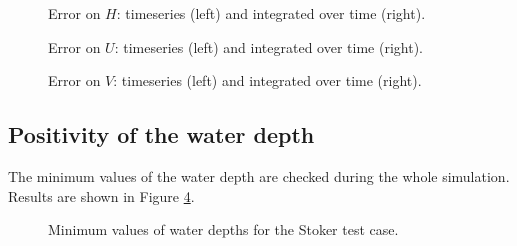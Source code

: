 \begin{figure}[H]
\begin{minipage}[t]{0.45\textwidth}
 \centering
\end{minipage}
\begin{minipage}[t]{0.55\textwidth}
 \centering
\end{minipage}
  \caption{Error on $H$: timeseries (left) and integrated over time (right).}
  \label{fig:stoker:ErrNumH}
\end{figure}

\begin{figure}[H]
\begin{minipage}[t]{0.45\textwidth}
 \centering
\end{minipage}
\begin{minipage}[t]{0.55\textwidth}
 \centering
\end{minipage}
  \caption{Error on $U$: timeseries (left) and integrated over time (right).}
  \label{fig:stoker:ErrNumU}
\end{figure}

\begin{figure}[H]
\begin{minipage}[t]{0.45\textwidth}
 \centering
\end{minipage}
\begin{minipage}[t]{0.55\textwidth}
 \centering
\end{minipage}
  \caption{Error on $V$: timeseries (left) and integrated over time (right).}
  \label{fig:stoker:ErrNumV}
\end{figure}

\subsection{Positivity of the water depth}

The minimum values of the water depth are checked during the whole simulation.
Results are shown in Figure \ref{t2d:stoker:minmax}.

\begin{figure}[H]
\centering
{}
\caption{Minimum values of water depths for the Stoker test case.}
\label{t2d:stoker:minmax}
\end{figure}

